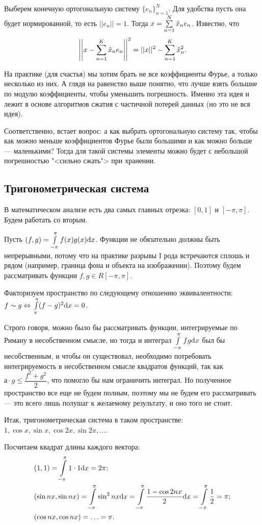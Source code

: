 Выберем конечную ортогональную систему $\{e_n\}_{n=1}^N$. Для удобства пусть она будет нормированной, то есть $||e_n|| = 1$. Тогда $x = \sum\limits_{n = 1}^{N} \hat{x}_ne_n$. Известно, что 
$$\left|\left|x - \sum\limits_{n=1}^{K}\hat{x}_ne_n\right|\right|^2 = ||x||^2 - \sum\limits_{n=1}^{K}\hat{x}_n^2.$$

На практике (для счастья) мы хотим брать не все коэффициенты Фурье, а только несколько из них. А глядя на равенство выше понятно, что лучше взять большие по модулю коэффициенты, чтобы уменьшить погрешность. Именно эта идея и лежит в основе алгоритмов сжатия с частичной потерей данных (но это не вся идея).

Соответственно, встает вопрос: а как выбрать ортогональную систему так, чтобы как можно меньше коэффициентов Фурье были большими и как можно больше --- маленькими? Тогда для такой системы элементы можно будет с небольшой погрешностью "<сильно сжать"> при хранении.

\subsection{Тригонометрическая система}
В математическом анализе есть два самых главных отрезка: $[0, 1]$ и $[-\pi, \pi]$. Будем работать со вторым.

Пусть $(f, g) = \int\limits_{-\pi}^{\pi} f(x)g(x) \mathrm{d} x$. Функции не обязательно должны быть непрерывными, потому что на практике разрывы I рода встречаются сплошь и рядом (например, граница фона и объекта на изображении). Поэтому будем рассматривать функции $f, g \in R[-\pi, \pi]$.

Факторизуем пространство по следующему отношению эквивалентности: $f \sim g \Leftrightarrow \\ \int\limits_{\pi}^{\pi}(f - g)^2 \mathrm{d} x = 0$. 

Строго говоря, можно было бы рассматривать функции, интегрируемые по Риману в несобственном смысле, но тогда и интеграл $\int\limits_{-\pi}^{\pi}fg \mathrm{d} x$ был бы несобственным, и чтобы он существовал, необходимо потребовать интегрируемость в несобственном смысле квадратов функций, так как $а\cdot g \leq \dfrac{f^2 + g^2}{2}$, что помогло бы нам ограничить интеграл. Но полученное пространство все еще не будем полным, поэтому мы не будем его рассматривать --- это всего лишь полушаг к желаемому результату, и оно того не стоит.

Итак, тригонометрическая система в таком пространстве: $1, \cos x, \sin x, \cos 2x, \sin 2x, \ldots$.

Посчитаем квадрат длины каждого вектора:
\begin{align*}
&(1, 1) =  \int\limits_{-\pi}^{\pi} 1 \cdot 1 \mathrm{d} x = 2\pi;\\
&(\sin nx, \sin nx) =  \int\limits_{-\pi}^{\pi} \sin^2 nx \mathrm{d} x =  \int\limits_{-\pi}^{\pi} \frac{1 - \cos 2nx}{2} \mathrm{d} x =  \int\limits_{-\pi}^{\pi} \dfrac{1}{2} = \pi;\\
&(\cos nx, \cos nx) = \ldots = \pi.
\end{align*}

